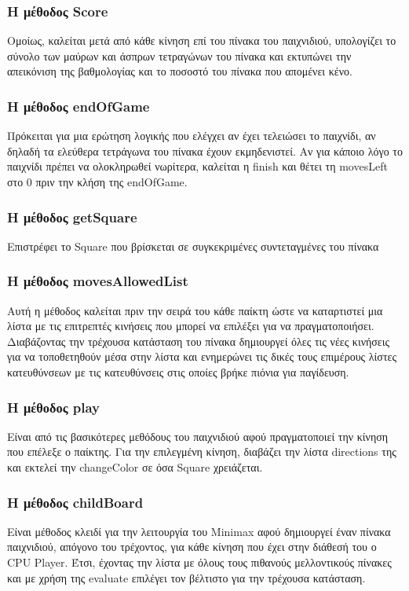 \documentclass[12pt]{article}
\begin{document}
        \subsubsection{Η μέθοδος Score}
        Ομοίως, καλείται μετά από κάθε κίνηση επί του πίνακα του παιχνιδιού, υπολογίζει το σύνολο των μαύρων και άσπρων τετραγώνων του πίνακα και εκτυπώνει την απεικόνιση της βαθμολογίας και το ποσοστό του πίνακα που απομένει κένο.
        \subsubsection{Η μέθοδος endOfGame}
        Πρόκειται για μια ερώτηση λογικής που ελέγχει αν έχει τελειώσει το παιχνίδι, αν δηλαδή τα ελεύθερα τετράγωνα του πίνακα έχουν εκμηδενιστεί. Αν για κάποιο λόγο το παιχνίδι πρέπει να ολοκληρωθεί νωρίτερα, καλείται η finish και θέτει τη movesLeft στο 0 πριν την κλήση της endOfGame.
        \subsubsection{Η μέθοδος getSquare}
        Επιστρέφει το Square που βρίσκεται σε συγκεκριμένες συντεταγμένες του πίνακα
        \subsubsection{Η μέθοδος movesAllowedList}
        Αυτή η μέθοδος καλείται πριν την σειρά του κάθε παίκτη ώστε να καταρτιστεί μια λίστα με τις επιτρεπτές κινήσεις που μπορεί να επιλέξει για να πραγματοποιήσει. Διαβάζοντας την τρέχουσα κατάσταση του πίνακα δημιουργεί όλες τις νέες κινήσεις για να τοποθετηθούν μέσα στην λίστα και ενημερώνει τις δικές τους επιμέρους λίστες κατευθύνσεων με τις κατευθύνσεις στις οποίες βρήκε πιόνια για παγίδευση. 
        \subsubsection{Η μέθοδος play}
        Είναι από τις βασικότερες μεθόδους του παιχνιδιού αφού πραγματοποιεί την κίνηση που επέλεξε ο παίκτης. Για την επιλεγμένη κίνηση, διαβάζει την λίστα directions της και εκτελεί την changeColor σε όσα Square χρειάζεται. 
        \subsubsection{Η μέθοδος childBoard}
        Είναι μέθοδος κλειδί για την λειτουργία του Minimax αφού δημιουργεί έναν πίνακα παιχνιδιού, απόγονο του τρέχοντος, για κάθε κίνηση που έχει στην διάθεσή του ο CPU Player. Έτσι, έχοντας την λίστα με όλους τους πιθανούς μελλοντικούς πίνακες και με χρήση της evaluate επιλέγει τον βέλτιστο για την τρέχουσα κατάσταση. 
\end{document}
